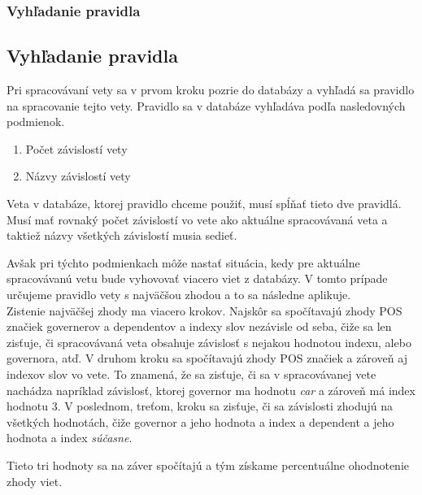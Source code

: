 %
%
{
	\subsubsection{Vyhľadanie pravidla}
}
{
	\subsection{Vyhľadanie pravidla}
}
\label{subsubsec:notenizer_vyhladanie_pravidla}
Pri spracovávaní vety sa v prvom kroku pozrie do databázy a vyhľadá sa pravidlo na spracovanie tejto vety. Pravidlo sa v databáze vyhľadáva podľa nasledovných podmienok.
\begin{enumerate}
	\item Počet závislostí vety
	\item Názvy závislostí vety
\end{enumerate}
Veta v databáze, ktorej pravidlo chceme použiť, musí spĺňať tieto dve pravidlá. Musí mať rovnaký počet závislostí vo vete ako aktuálne spracovávaná veta a taktiež názvy všetkých závislostí musia sedieť.

Avšak pri týchto podmienkach môže nastať situácia, kedy pre aktuálne spracovávanú vetu bude vyhovovať viacero viet z databázy. V tomto prípade určujeme pravidlo vety s najväčšou zhodou a to sa následne aplikuje.
\\

Zistenie najväčšej zhody ma viacero krokov. Najskôr sa spočítavajú zhody POS značiek governerov a dependentov a indexy slov nezávisle od seba, čiže sa len zisťuje, či spracovávaná veta obsahuje závislosť s nejakou hodnotou indexu, alebo governora, atď.
V druhom kroku sa spočítavajú zhody POS značiek a zároveň aj indexov slov vo vete. To znamená, že sa zisťuje, či sa v spracovávanej vete nachádza napríklad závislosť, ktorej governor ma hodnotu \textit{car} a zároveň má index hodnotu 3.
V poslednom, treťom, kroku sa zisťuje, či sa závislosti zhodujú na všetkých hodnotách, čiže governor a jeho hodnota a index a dependent a jeho hodnota a index \textit{súčasne}.

Tieto tri hodnoty sa na záver spočítajú a tým získame percentuálne ohodnotenie zhody viet.
